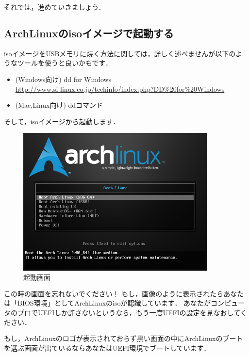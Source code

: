 \documentclass[b5j,twoside,openany]{jsbook}
\begin{document}
      それでは，進めていきましょう．

    \subsection{ArchLinuxのisoイメージで起動する}
    \label{sub:ArchLinuxのisoイメージで起動する}
      isoイメージをUSBメモリに焼く方法に関しては，詳しく述べませんが以下のようなツールを使うと良いかもです．
      
      \begin{itemize}
        \item (Windows向け) dd for Windows \\ \url{http://www.si-linux.co.jp/techinfo/index.php?DD%20for%20Windows}
        \item (Mac,Linux向け) ddコマンド
      \end{itemize}
      
      そして，isoイメージから起動します．

      \begin{figure}[h!p]
        \begin{center}
          \includegraphics[width=100mm]{images/boot.png}
        \end{center}
        \caption{起動画面}
        \label{bootscreen}
      \end{figure}
      
      この時の画面を忘れないでください！
      もし，画像のように表示されたらあなたは「BIOS環境」としてArchLinuxのisoが認識しています．
      あなたがコンピュータのプロでUEFIしか許さないというなら，もう一度UEFIの設定を見なおしてください．

      もし，ArchLinuxのロゴが表示されておらず黒い画面の中にArchLinuxのブートを選ぶ画面が出ているならあなたはUEFI環境でブートしています．
\end{document}

